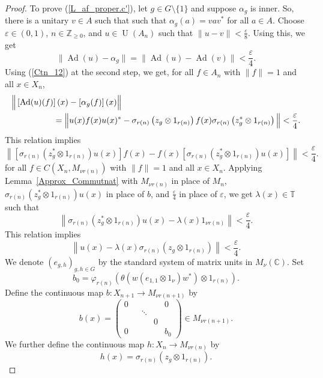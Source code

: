 \documentclass[10pt]{amsart}
\numberwithin{equation}{section}
\theoremstyle{definition}
\newcommand{\ep}{\varepsilon}
\newcommand{\Nz}{{\mathbb{Z}}_{\geq 0}}
\newcommand{\Ad}{{\operatorname{Ad}}}
\newcommand{\U}{{\operatorname{U}}}
\begin{document}
\begin{proof}
To prove (\ref{L_af_proper.c'}), let $g \in G \setminus \{1\}$ and 
suppose $\alpha_g$ is inner.
 So, there is a unitary $v \in A$ such that such that $\alpha_g (a) = v a v^*$ for all $a \in A$.
 Choose  $\ep \in (0, 1)$, $n \in \Nz$, and $u \in \U(A_n)$ such that 
 $\|u - v \|< \frac{\ep}{8}$.
  Using this, we get
\begin{equation}\label{Eq520200306}
 \|\Ad (u) - \alpha_g \| =\|\Ad (u) - \Ad (v) \| < \frac{\ep}{4}.
\end{equation}
Using (\ref{Ctn_12}) at the second step, 
we get,
for all $f \in A_n$ with $\| f \| = 1$ and all $x \in X_n$,
\begin{align*}
&\Big\|
\left[\Ad (u)(f)\right](x) - \left[\alpha_g (f)\right](x) 
\Big\|
\\
 & \hspace*{5em} {\mbox{}}=
 \Big\| u(x) f(x) u(x)^* 
 - 
 \sigma_{r(n)}\left(z_g \otimes 1_{r(n)}\right) f(x) \sigma_{r(n)}\left(z^*_g \otimes 1_{r(n)}\right)\Big\|
 < \frac{\ep}{4}.
\end{align*}
This relation implies
\[
\left\| \left[\sigma_{r(n)} \left(z^*_g \otimes 1_{r(n)}\right) u(x)\right] f(x) 
 - 
 f(x) \left[\sigma_{r(n)}\left(z^*_g \otimes 1_{r(n)}\right) u(x)\right]\right\|
 < \frac{\ep}{4}.
\]
for all $f \in C(X_n, M_{\nu r(n)})$ with $\| f \| = 1$ and all $x \in X_n$.
Applying Lemma~\ref{Approx_Commutnat} with $M_{\nu r(n)}$ in place of $M_n$,
$\sigma_{r(n)} \left(z^*_g \otimes 1_{r(n)}\right) u(x)$ in place of $b$,  and $\frac{\ep}{4}$ in place of $\ep$,
 we get $\lambda (x) \in \mathbb{T}$ such that 
\[
\left\| \sigma_{r(n)}\left(z^*_g \otimes 1_{r(n)}\right) u(x)  - \lambda (x) 1_{\nu r(n)}  \right\|< \frac{\ep}{4}.
\]
 This relation implies  
\begin{equation}\label{Eq7.20200304}
\left\|  u(x)  - \lambda(x) \sigma_{r(n)} \left(z_g \otimes 1_{r(n)}\right)\right\|< \frac{\ep}{4}.
\end{equation}
%
We denote $(e_{g, h})_{g, h \in G}$ by the standard system of matrix units in $M_{\nu} (\mathbb{C})$.
Set 
\begin{equation}
\label{Eq1.20200622}
b_0= \varphi_{r(n)} \left(\theta \left(w(e_{1, 1} \otimes 1_{\nu})w^*\right) \otimes 1_{r(n)}\right).
\end{equation} 
Define the continuous map $b \colon X_{n+1} \to M_{\nu r(n+1)}$ by
\begin{equation}\label{Eq12.20200306}
b(x)=
 \left( \begin{matrix}
    0 & & & &0 \\
    & &  \ddots      &      \\
    & & &  0 \\
 0  & & & &    b_0
 \end{matrix} \right)
 \in M_{\nu r(n+1)}.
\end{equation}
We further define the continuous map $h\colon X_n \to M_{\nu r(n)}$ by  
\begin{equation}\label{Eq12.20200306'}
h(x) = \sigma_{r(n)} \left(z_g \otimes 1_{r(n)}\right). 
\end{equation}


\end{proof}
\end{document}
